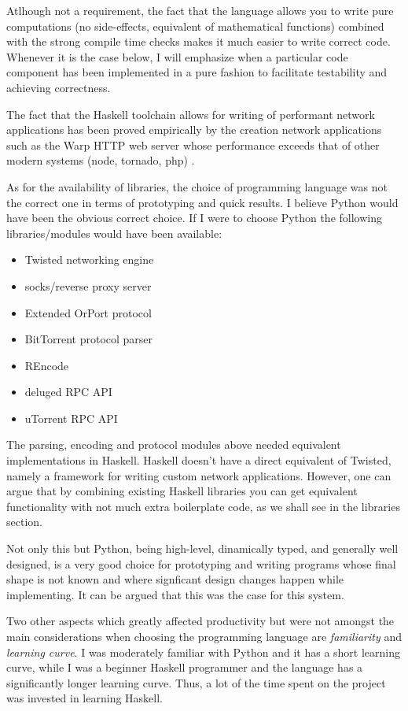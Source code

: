 \documentclass[11pt]{article} %
\begin{document}
Atlhough not a requirement, the fact that the language allows you to write pure computations (no side-effects, equivalent of mathematical functions) combined with the strong compile time checks makes it much  easier to write correct code. Whenever it is the case below, I will emphasize when a particular code component has been implemented in a pure fashion to facilitate testability and achieving correctness.

The fact that the Haskell toolchain allows for writing of performant network applications has been proved empirically by the creation network applications such as the Warp HTTP web server whose performance exceeds that of other modern systems (node, tornado, php) \citep*{web:warpCrossBenchmark}.

As for the availability of libraries, the choice of programming language was not the correct one in terms of prototyping and quick results. I believe Python would have been the obvious correct choice. If I were to choose Python the following libraries/modules would have been available:

\begin{itemize}
\item Twisted networking engine 
\item socks/reverse proxy server
\item Extended OrPort protocol  
\item BitTorrent protocol parser
\item REncode
\item deluged RPC API 
\item uTorrent RPC API
\end{itemize}

The parsing, encoding and protocol modules above needed equivalent implementations in Haskell.  Haskell doesn't have a direct equivalent of Twisted, namely a framework for writing custom network applications. However, one can argue that by combining existing Haskell libraries you can get equivalent functionality with not much extra boilerplate code, as we shall see in the libraries section.

Not only this but Python, being high-level, dinamically typed, and generally well designed, is a very good choice for prototyping and writing programs whose final shape is not known and where signficant design changes happen while implementing. It can be argued that this was the case for this system.

Two other aspects which greatly affected productivity but were not amongst the main considerations when choosing the programming language are \textit{familiarity} and \textit{learning curve}. I was moderately familiar with Python and it has a short learning curve, while I was a beginner Haskell programmer and the language has a significantly longer learning curve. Thus, a lot of the time spent on the project was invested in learning Haskell.
\end{document}
